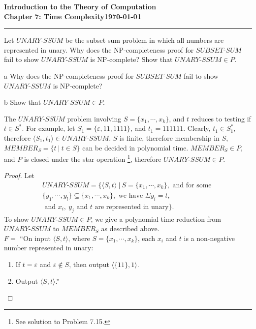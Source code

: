 \documentclass[11pt]{article}
\newcommand{\dated}{\today}
\begin{document}
\textbf{Introduction to the Theory of
Computation}\hfill\textbf{\myname}\\[0.01in]
\textbf{Chapter 7: Time Complexity}\hfill\textbf{\dated}\\
\smallskip\hrule\bigskip

\begin{problem}{7.17}
Let $UNARY\text{-}SSUM$ be the subset sum problem in which all numbers are represented in unary. Why does the NP-completeness proof for $SUBSET\text{-}SUM$ fail to show $UNARY\text{-}SSUM$ is NP-complete? Show that $UNARY\text{-}SSUM \in P$.
\end{problem} 

\begin{problem}[Part]{a}
Why does the NP-completeness proof for $SUBSET\text{-}SUM$ fail to show $UNARY\text{-}SSUM$ is NP-complete?
\end{problem}

\begin{problem}[Part]{b}
Show that $UNARY\text{-}SSUM \in P$.
\end{problem}

\begin{idea}The $UNARY\text{-}SSUM$ problem involving $S = \{x_1, \cdots, x_k\}$, and $t$ reduces to testing if $t \in S^{*}$. For example, let $S_1 = \{\varepsilon, 11, 1111\}$, and $t_1 = 111111$. Clearly, $t_1 \in S_1^{*}$, therefore $\langle S_1, t_1 \rangle \in UNARY\text{-}SSUM$. $S$ is finite, therefore membership in $S$, $MEMBER_S = \{t \ | \ t \in S \}$ can be decided in polynomial time. $MEMBER_S \in P$, and $P$ is closed under the star operation \footnote{See solution to Problem 7.15.}, therefore $UNARY\text{-}SSUM \in P$.
\end{idea}
 
\begin{proof}
Let
\begin{align*} 
UNARY\text{-}SSUM = \{\langle S, t \rangle \ | \ S = \{x_1, \cdots, x_k\}, \text{ and for some } \\
\{y_1, \cdots , y_l\} \subseteq \{x_1, \cdots, x_k\}, \text{ we have } \Sigma y_i = t, \\
\text{ and } x_i, \ y_j \text{ and } t \text{ are represented in unary}\}.
\end{align*}
To show $UNARY\text{-}SSUM \in P$, we give a polynomial time reduction from $UNARY\text{-}SSUM$ to $MEMBER_S$ as described above. \\

$F =$ \textquotedblleft On input $\langle S, t \rangle$, where $S = \{x_1, \cdots, x_k\}$, each $x_i$ and $t$ is a non-negative number represented in unary:
\begin{enumerate}
\item If $t = \varepsilon$ and $\varepsilon \notin S$, then output $\langle \{11\}, 1  \rangle$.
\item Output $\langle S, t \rangle$.\textquotedblright
\end{enumerate}
\end{proof}
\end{document}
